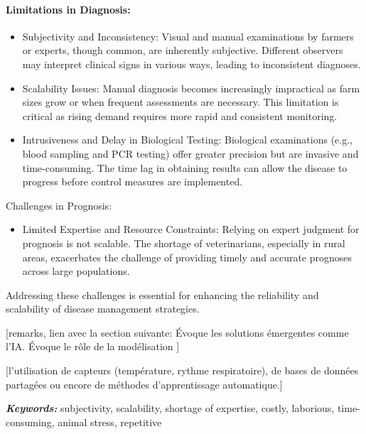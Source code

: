 \paragraph{Limitations in Diagnosis:} 
\begin{itemize}
    \item Subjectivity and Inconsistency: Visual and manual examinations by farmers or experts, though common, are inherently subjective. Different observers may interpret clinical signs in various ways, leading to inconsistent diagnoses.
    \item Scalability Issues: Manual diagnosis becomes increasingly impractical as farm sizes grow or when frequent assessments are necessary. This limitation is critical as rising demand requires more rapid and consistent monitoring.
    \item Intrusiveness and Delay in Biological Testing: Biological examinations (e.g., blood sampling and PCR testing) offer greater precision but are invasive and time-consuming. The time lag in obtaining results can allow the disease to progress before control measures are implemented.
\end{itemize}

Challenges in Prognosis:
\begin{itemize}
    \item Limited Expertise and Resource Constraints: Relying on expert judgment for prognosis is not scalable. The shortage of veterinarians, especially in rural areas, exacerbates the challenge of providing timely and accurate prognoses across large populations.
\end{itemize}

Addressing these challenges is essential for enhancing the reliability and scalability of disease management strategies. 


[remarks, lien avec la section suivante: Évoque les solutions émergentes comme l'IA. Évoque le rôle de la modélisation ]





[l’utilisation de capteurs (température, rythme respiratoire), de bases de données partagées ou encore de méthodes d’apprentissage automatique.]

\textit{\textbf{Keywords:}} subjectivity, scalability, shortage of expertise, costly, laborious, time-consuming, animal stress, repetitive


